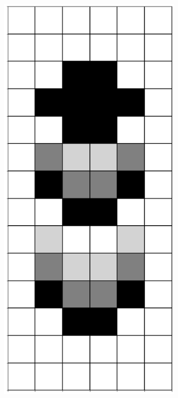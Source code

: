 \documentclass[12pt]{article}
\numberwithin{figure}{section} %
\begin{document}
\begin{figure}[H]
\begin{subfigure}{0.18\textwidth}
     	\subcaption{}
   	\end{subfigure}
        	\begin{subfigure}{0.18\textwidth}
     	\centering
     	\includegraphics[width=\linewidth]{Section4/34.3}

\end{subfigure}
\end{figure}
\end{document}
